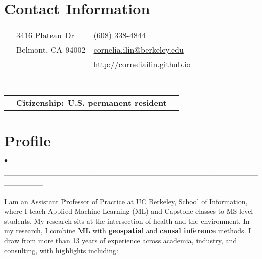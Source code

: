 \documentclass[margin,line]{res}                          %
\newenvironment{list2}{
  \begin{list}{$\bullet$}{%
      \setlength{\itemsep}{0in}
      \setlength{\parsep}{0in} \setlength{\parskip}{0in}
      \setlength{\topsep}{0in} \setlength{\partopsep}{0in} 
      \setlength{\leftmargin}{0.2in}}}{\end{list}}
\begin{document}
    

\begin{resume}
\thispagestyle{plain} %

\section{\sc Contact Information}
\vspace{.05in}
\begin{tabular}{@{}p{0.20in}p{3.75in}p{2.75in}}
 & 3416 Plateau Dr & (608) 338-4844\\   
 & Belmont, CA  94002& \href{mailto: Your email}{cornelia.ilin@berkeley.edu}\\            
 & & \href{http://corneliailin.github.io}{http://corneliailin.github.io}\\         
 &  & \\         
\end{tabular}

\section{\sc }
\begin{tabular}{@{}p{0.20in}p{3.75in}p{2.75in}}
 & \textbf{Citizenship: U.S. permanent resident}
\end{tabular}
\vspace{0.1cm}


\section{\sc Profile}
\begin{list2}
\item[] -----------------------------------------------------------------------------------------------------------------------------
\item[] I am an Assistant Professor of Practice at UC Berkeley, School of Information, where I teach Applied Machine Learning (ML) and Capstone classes to MS-level students. My research sits at the intersection of health and the environment. In my research, I combine \textbf{ML} with \textbf{geospatial} and \textbf{causal inference} methods. I draw from more than 13 years of experience across academia, industry, and consulting, with highlights including:
\end{list2}

\vspace{0.2 cm}
\begin{outline}


\end{outline}
\end{resume}
\end{document}
